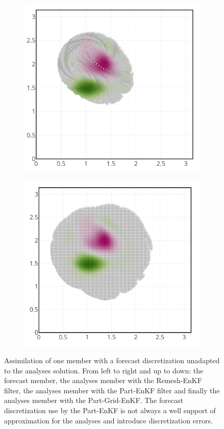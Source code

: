 \begin{figure}[h!]
\begin{subfigure}{0.45\textwidth}
		\includegraphics[width=0.8\linewidth]{./images/app2d/assim_member_ppf.png}
	\end{subfigure}
	\begin{subfigure}{0.45\textwidth}
		\centering
		\includegraphics[width=0.8\linewidth]{./images/app2d/assim_member_pgf.png}
	\end{subfigure}
	\caption{Assimilation of one member with a forecast discretization unadapted to the analyses solution. From left to right and up to down: the forecast member, the analyses member with the Remesh-EnKF filter, the analyses member with the Part-EnKF filter and finally the analyses member with the Part-Grid-EnKF. The forecast discretization use by the Part-EnKF is not always a well support of approximation for the analyses and introduce discretization errors.}
	\label{fig:assim_member}
\end{figure}

